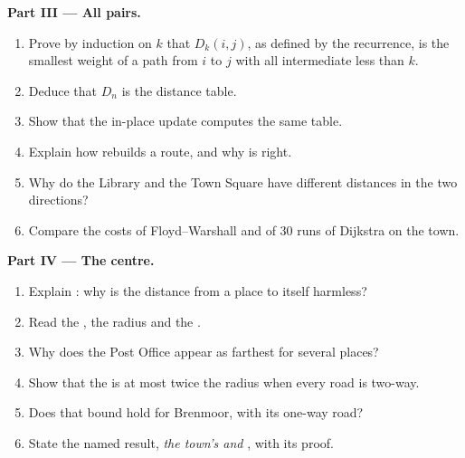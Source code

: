 \begin{problem}
\medskip\noindent\textbf{Part III --- All pairs.}
\begin{enumerate}[resume]
\item Prove by induction on $k$ that $D_k(i, j)$, as defined by the recurrence, is the smallest weight of a path from
$i$ to $j$ with all intermediate  less than $k$.
\item Deduce that $D_n$ is the distance table.
\item Show that the in-place update computes the same table.
\item Explain how  rebuilds a route, and why  is right.
\item Why do the Library and the Town Square have different distances in the two directions?
\item Compare the costs of Floyd--Warshall and of 30 runs of Dijkstra on the town.
\end{enumerate}

\medskip\noindent\textbf{Part IV --- The centre.}
\begin{enumerate}[resume]
\item Explain : why is the distance from a place to itself harmless?
\item Read the , the radius and the .
\item Why does the Post Office appear as farthest for several places?
\item Show that the  is at most twice the radius when every road is two-way.
\item Does that bound hold for Brenmoor, with its one-way road?
\item State the named result, \emph{the town's  and }, with its proof.
\end{enumerate}
\end{problem}

